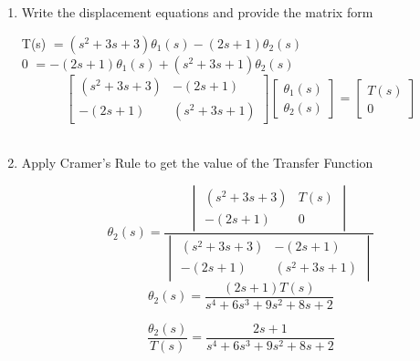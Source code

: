 ﻿\documentclass[11pt]{article}
\begin{document}
\begin{enumerate}[label=(\alph*),itemindent=*, leftmargin=*, nolistsep]
\vspace{15pt}
    \item Write the displacement equations and provide the matrix form
\begin{center}
    T(s) $= (s^2 + 3s + 3)\theta_1(s) - (2s + 1)\theta_2(s)$\\
    0 $= -(2s + 1)\theta_1(s) + (s^2 + 3s + 1)\theta_2(s)$\\
    \[
        \begin{bmatrix}
        (s^2 + 3s + 3) & -(2s + 1) \\
        -(2s + 1) & (s^2 + 3s + 1)
        \end{bmatrix}
        \begin{bmatrix}
        \theta_1(s) \\
        \theta_2(s)
        \end{bmatrix}
        =
        \begin{bmatrix}
        T(s)\\
        0
        \end{bmatrix}
    \]\\
\end{center}
\vspace{15pt}
    \item Apply Cramer's Rule to get the value of the Transfer Function
\begin{center}
    \[
        \theta_2(s) = 
            \frac{\begin{vmatrix}
                (s^2 + 3s + 3) & T(s)\\
                -(2s + 1) & 0
            \end{vmatrix}
        }{\begin{vmatrix}
                (s^2 + 3s + 3) & -(2s + 1) \\
                -(2s + 1) & (s^2 + 3s + 1)
            \end{vmatrix}
        }
    \]
    \[
    \theta_2(s) = \frac{(2s+1)T(s)}{s^4 + 6s^3 + 9s^2 + 8s + 2}
    \] 

    \[
    \boxed{\frac{\theta_2(s)}{T(s)} = \frac{2s+1}{s^4 + 6s^3 + 9s^2 + 8s + 2}}
    \] 

\end{center}
\end{enumerate}

\end{document}
